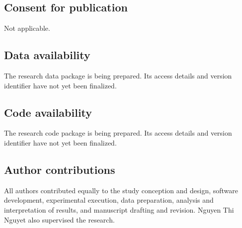 \documentclass[pdflatex,sn-basic,Numbered,iicol]{sn-jnl}
\begin{document}
\subsection*{Consent for publication}
Not applicable.

\subsection*{Data availability}
The research data package is being prepared. Its access details and version identifier have not yet been finalized.

\subsection*{Code availability}
The research code package is being prepared. Its access details and version identifier have not yet been finalized.

\subsection*{Author contributions}
All authors contributed equally to the study conception and design, software development, experimental execution, data preparation, analysis and interpretation of results, and manuscript drafting and revision. Nguyen Thi Nguyet also supervised the research.

\begingroup
{}

\endgroup
\end{document}
